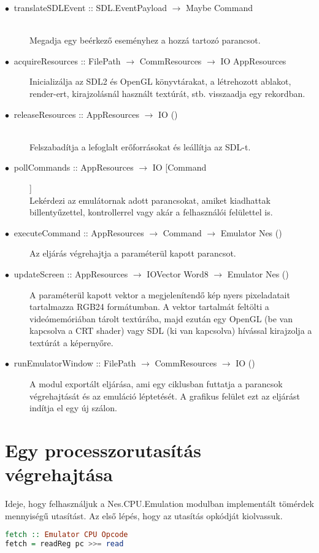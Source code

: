 \begin{description}
	\item[$\bullet\:$ translateSDLEvent :: SDL.EventPayload $\rightarrow$ Maybe Command] \hfill \\
	Megadja egy beérkező eseményhez a hozzá tartozó parancsot.
	\item[$\bullet\:$ acquireResources :: FilePath $\rightarrow$ CommResources $\rightarrow$ IO AppResources] \hfill Inicializálja az SDL2 és OpenGL könyvtárakat, a létrehozott ablakot, render-ert, kirajzolásnál használt textúrát, stb. visszaadja egy rekordban.
	\item[$\bullet\:$ releaseResources :: AppResources $\rightarrow$ IO ()] \hfill \\
	Felszabadítja a lefoglalt erőforrásokat és leállítja az SDL-t.
	\item[$\bullet\:$ pollCommands :: AppResources $\rightarrow$ IO [Command]] \hfill \\
	Lekérdezi az emulátornak adott parancsokat, amiket kiadhattak billentyűzettel, kontrollerrel vagy akár a felhasználói felülettel is. 
	\item[$\bullet\:$ executeCommand :: AppResources $\rightarrow$ Command $\rightarrow$ Emulator Nes ()] \hfill
	Az eljárás végrehajtja a paraméterül kapott parancsot.
	\item[$\bullet\:$ updateScreen :: AppResources $\rightarrow$ IOVector Word8 $\rightarrow$ Emulator Nes ()] \hfill
	A paraméterül kapott vektor a megjelenítendő kép nyers pixeladatait tartalmazza RGB24 formátumban. A vektor tartalmát feltölti a videómemóriában tárolt textúrába, majd ezután egy OpenGL (be van kapcsolva a CRT shader) vagy SDL (ki van kapcsolva) hívással kirajzolja a textúrát a képernyőre.
	\item[$\bullet\:$ runEmulatorWindow :: FilePath $\rightarrow$ CommResources $\rightarrow$ IO ()] \hfill
	A modul exportált eljárása, ami egy ciklusban futtatja a parancsok végrehajtását és az emuláció léptetését. A grafikus felület ezt az eljárást indítja el egy új szálon.
\end{description}

\section{Egy processzorutasítás végrehajtása}
Ideje, hogy felhasználjuk a Nes.CPU.Emulation modulban implementált tömérdek mennyiségű utasítást. Az első lépés, hogy az utasítás opkódját kiolvassuk.
\vspace{0.3cm}
\begin{lstlisting}[language=Haskell]
fetch :: Emulator CPU Opcode
fetch = readReg pc >>= read
\end{lstlisting}

